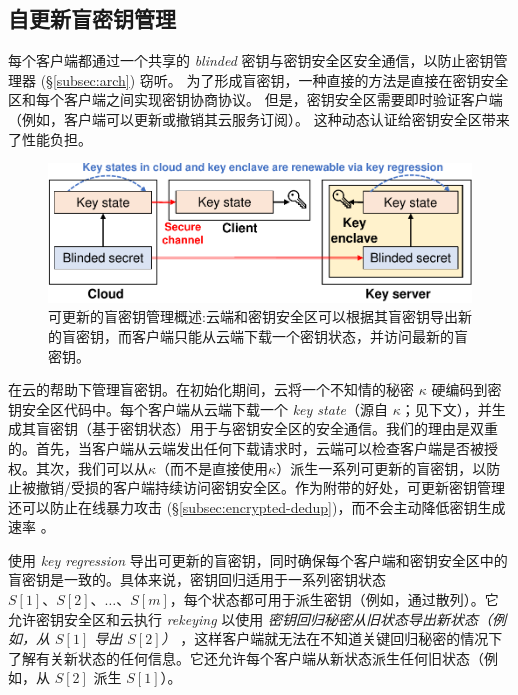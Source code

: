 \subsection{自更新盲密钥管理}
\label{subsec:key-management}

每个客户端都通过一个共享的 \textit{ blinded} 密钥与密钥安全区安全通信，以防止密钥管理器 (\S\ref{subsec:arch}) 窃听。 为了形成盲密钥，一种直接的方法是直接在密钥安全区和每个客户端之间实现密钥协商协议。 但是，密钥安全区需要即时验证客户端（例如，客户端可以更新或撤销其云服务订阅）。 这种动态认证给密钥安全区带来了性能负担。


\begin{figure}[t]
\centering
\includegraphics[width=\textwidth]{pic/sgxdedup/blindkey.pdf}
\vspace{-16pt}
\caption{可更新的盲密钥管理概述:云端和密钥安全区可以根据其盲密钥导出新的盲密钥，而客户端只能从云端下载一个密钥状态，并访问最新的盲密钥。}
\label{fig:keymanage}
\end{figure}

\sysnameS 在云的帮助下管理盲密钥。在初始化期间，云将一个不知情的秘密 $\kappa$ 硬编码到密钥安全区代码中。每个客户端从云端下载一个 \textit{ key state}（源自 $\kappa$；见下文），并生成其盲密钥（基于密钥状态）用于与密钥安全区的安全通信。我们的理由是双重的。首先，当客户端从云端发出任何下载请求时，云端可以检查客户端是否被授权。其次，我们可以从$\kappa$（而不是直接使用$\kappa$）派生一系列可更新的盲密钥，以防止被撤销/受损的客户端持续访问密钥安全区。作为附带的好处，可更新密钥管理还可以防止在线暴力攻击 (\S\ref{subsec:encrypted-dedup})，而不会主动降低密钥生成速率 \cite{bellare13b}。

\sysnameS 使用 \textit{ key regression} \cite{fu06} 导出可更新的盲密钥，同时确保每个客户端和密钥安全区中的盲密钥是一致的。具体来说，密钥回归适用于一系列密钥状态 $S[1]、S[2]、\ldots、S[m]$，每个状态都可用于派生密钥（例如，通过散列）。它允许密钥安全区和云执行 \textit{ rekeying} 以使用 \textit{ 密钥回归秘密从旧状态导出新状态（例如，从 $S[1]$ 导出 $S[2]$） }，这样客户端就无法在不知道关键回归秘密的情况下了解有关新状态的任何信息。它还允许每个客户端从新状态派生任何旧状态（例如，从 $S[2]$ 派生 $S[1]$）。

